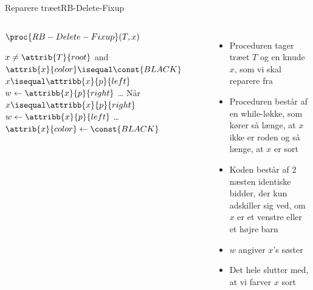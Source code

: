 \documentclass[aspectratio=1610]{beamer}
\begin{document}
\begin{frame}{Reparere træet}{RB-Delete-Fixup}
    \begin{columns}
        \begin{block}{$\proc{RB-Delete-Fixup}(T,x)$}
            \small
        
            \vspace{-\abovedisplayskip}
            \begin{codebox}
                \li \While $x \neq \attrib{T}{root}$ and $\attrib{x}{color}
                        \isequal \const{BLACK}$ 
                    \Do
                \li     \If $x \isequal \attribb{x}{p}{left}$ 
                        \Then
                \li         $w \gets \attribb{x}{p}{right}$
                \zi     \ldots
                \li     \Else \Comment Når $x \isequal \attribb{x}{p}{right}$ 
                \li         $w \gets \attribb{x}{p}{left}$ 
                \zi         \ldots
                        \End
                    \End
                \li $\attrib{x}{color} \gets \const{BLACK}$ 
            \end{codebox}
        \end{block}
    
        \begin{itemize}[<+->]
            \item Proceduren tager træet $T$ og en knude $x$, som vi skal
                reparere fra
            \item Proceduren består af en while-løkke, som kører så længe, at
                $x$ ikke er roden og så længe, at $x$ er sort
            \item Koden består af 2 næsten identiske bidder, der kun adskiller
                sig ved, om $x$ er et venstre eller et højre barn
            \item $w$ angiver $x$'s søster
            \item Det hele slutter med, at vi farver $x$ sort
        \end{itemize}
    \end{columns}
\end{frame}
\end{document}
